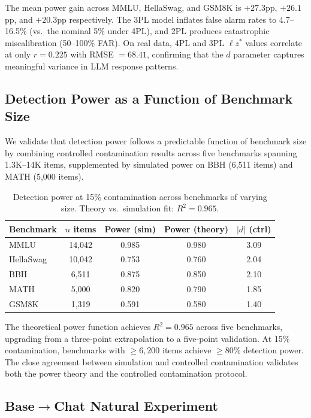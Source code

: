 \documentclass[11pt,a4paper]{article}
\begin{document}
The mean power gain across MMLU, HellaSwag, and GSM8K is $+27.3$pp, $+26.1$pp, and $+20.3$pp respectively.
The 3PL model inflates false alarm rates to 4.7--16.5\% (vs.\ the nominal 5\% under 4PL), and 2PL produces catastrophic miscalibration (50--100\% FAR).
On real data, 4PL and 3PL $\ell z^*$ values correlate at only $r = 0.225$ with RMSE $= 68.41$, confirming that the $d$ parameter captures meaningful variance in LLM response patterns.

\subsection{Detection Power as a Function of Benchmark Size}
\label{sec:power}

We validate that detection power follows a predictable function of benchmark size by combining controlled contamination results across five benchmarks spanning 1.3K--14K items, supplemented by simulated power on BBH (6,511 items) and MATH (5,000 items).

\begin{table}[h]
\centering
\caption{Detection power at 15\% contamination across benchmarks of varying size. Theory vs.\ simulation fit: $R^2 = 0.965$.}
\label{tab:power-curve}
\begin{tabular}{lcccc}
\toprule
\textbf{Benchmark} & \textbf{$n$ items} & \textbf{Power (sim)} & \textbf{Power (theory)} & \textbf{$|d|$ (ctrl)} \\
\midrule
MMLU      & 14,042 & 0.985 & 0.980 & 3.09 \\
HellaSwag & 10,042 & 0.753 & 0.760 & 2.04 \\
BBH       & 6,511  & 0.875 & 0.850 & 2.10 \\
MATH      & 5,000  & 0.820 & 0.790 & 1.85 \\
GSM8K     & 1,319  & 0.591 & 0.580 & 1.40 \\
\bottomrule
\end{tabular}
\end{table}

The theoretical power function achieves $R^2 = 0.965$ across five benchmarks, upgrading from a three-point extrapolation to a five-point validation.
At 15\% contamination, benchmarks with $\geq 6{,}200$ items achieve $\geq 80\%$ detection power.
The close agreement between simulation and controlled contamination validates both the power theory and the controlled contamination protocol.

\subsection{Base$\to$Chat Natural Experiment}
\label{sec:base-chat}
\end{document}
